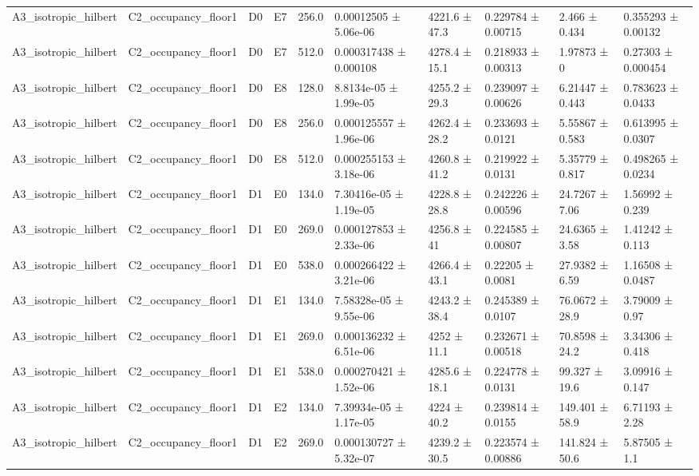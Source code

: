 \begin{table}
\begin{tabular}{llllllllll}
A3\_isotropic\_hilbert & C2\_occupancy\_floor1 & D0 & E7 & 256.0 & 0.00012505 ± 5.06e-06 & 4221.6 ± 47.3 & 0.229784 ± 0.00715 & 2.466 ± 0.434 & 0.355293 ± 0.00132 \\
A3\_isotropic\_hilbert & C2\_occupancy\_floor1 & D0 & E7 & 512.0 & 0.000317438 ± 0.000108 & 4278.4 ± 15.1 & 0.218933 ± 0.00313 & 1.97873 ± 0 & 0.27303 ± 0.000454 \\
A3\_isotropic\_hilbert & C2\_occupancy\_floor1 & D0 & E8 & 128.0 & 8.8134e-05 ± 1.99e-05 & 4255.2 ± 29.3 & 0.239097 ± 0.00626 & 6.21447 ± 0.443 & 0.783623 ± 0.0433 \\
A3\_isotropic\_hilbert & C2\_occupancy\_floor1 & D0 & E8 & 256.0 & 0.000125557 ± 1.96e-06 & 4262.4 ± 28.2 & 0.233693 ± 0.0121 & 5.55867 ± 0.583 & 0.613995 ± 0.0307 \\
A3\_isotropic\_hilbert & C2\_occupancy\_floor1 & D0 & E8 & 512.0 & 0.000255153 ± 3.18e-06 & 4260.8 ± 41.2 & 0.219922 ± 0.0131 & 5.35779 ± 0.817 & 0.498265 ± 0.0234 \\
A3\_isotropic\_hilbert & C2\_occupancy\_floor1 & D1 & E0 & 134.0 & 7.30416e-05 ± 1.19e-05 & 4228.8 ± 28.8 & 0.242226 ± 0.00596 & 24.7267 ± 7.06 & 1.56992 ± 0.239 \\
A3\_isotropic\_hilbert & C2\_occupancy\_floor1 & D1 & E0 & 269.0 & 0.000127853 ± 2.33e-06 & 4256.8 ± 41 & 0.224585 ± 0.00807 & 24.6365 ± 3.58 & 1.41242 ± 0.113 \\
A3\_isotropic\_hilbert & C2\_occupancy\_floor1 & D1 & E0 & 538.0 & 0.000266422 ± 3.21e-06 & 4266.4 ± 43.1 & 0.22205 ± 0.0081 & 27.9382 ± 6.59 & 1.16508 ± 0.0487 \\
A3\_isotropic\_hilbert & C2\_occupancy\_floor1 & D1 & E1 & 134.0 & 7.58328e-05 ± 9.55e-06 & 4243.2 ± 38.4 & 0.245389 ± 0.0107 & 76.0672 ± 28.9 & 3.79009 ± 0.97 \\
A3\_isotropic\_hilbert & C2\_occupancy\_floor1 & D1 & E1 & 269.0 & 0.000136232 ± 6.51e-06 & 4252 ± 11.1 & 0.232671 ± 0.00518 & 70.8598 ± 24.2 & 3.34306 ± 0.418 \\
A3\_isotropic\_hilbert & C2\_occupancy\_floor1 & D1 & E1 & 538.0 & 0.000270421 ± 1.52e-06 & 4285.6 ± 18.1 & 0.224778 ± 0.0131 & 99.327 ± 19.6 & 3.09916 ± 0.147 \\
A3\_isotropic\_hilbert & C2\_occupancy\_floor1 & D1 & E2 & 134.0 & 7.39934e-05 ± 1.17e-05 & 4224 ± 40.2 & 0.239814 ± 0.0155 & 149.401 ± 58.9 & 6.71193 ± 2.28 \\
A3\_isotropic\_hilbert & C2\_occupancy\_floor1 & D1 & E2 & 269.0 & 0.000130727 ± 5.32e-07 & 4239.2 ± 30.5 & 0.223574 ± 0.00886 & 141.824 ± 50.6 & 5.87505 ± 1.1 \\

\end{tabular}
\end{table}
